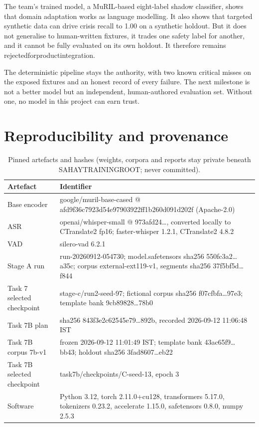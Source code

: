 \documentclass[11pt,a4paper]{article}
\newcommand{\codeus}{\textunderscore\allowbreak}
\DeclareRobustCommand{\code}[1]{{\ttfamily\let\_\codeus #1}}
\begin{document}
The team's trained model, a MuRIL-based eight-label shadow classifier, shows that domain adaptation
works as language modelling. It also shows that targeted synthetic data can drive crisis recall to
1.00 on a synthetic holdout. But it does not generalise to human-written fixtures, it trades one
safety label for another, and it cannot be fully evaluated on its own holdout. It therefore remains
\code{rejected\_for\_product\_integration}.

The deterministic pipeline stays the authority, with two known critical misses on the exposed
fixtures and an honest record of every failure. The next milestone is not a better model but an
independent, human-authored evaluation set. Without one, no model in this project can earn trust.

\appendix
\section{Reproducibility and provenance}
\label{app:repro}

\begin{table}[!htbp]
\centering\footnotesize
\caption{Pinned artefacts and hashes (weights, corpora and reports stay private beneath \code{SAHAY\_TRAINING\_ROOT}; never committed).}
\begin{tabularx}{\linewidth}{@{}>{\raggedright\arraybackslash}p{4.0cm}>{\raggedright\arraybackslash}X@{}}
\toprule
Artefact & Identifier \\
\midrule
Base encoder & \code{google/muril-base-cased} @ \code{afd9f36c7923d54e97903922ff1b260d091d202f} (Apache-2.0) \\
ASR & \code{openai/whisper-small} @ \code{973afd24\ldots}, converted locally to CTranslate2 fp16; faster-whisper 1.2.1, CTranslate2 4.8.2 \\
VAD & \code{silero-vad} 6.2.1 \\
Stage A run & \code{run-20260912-054730}; \code{model.safetensors} sha256 \code{550fc3a2\ldots a35c}; corpus \code{external-ext119-v1}, segments sha256 \code{37f5bf5d\ldots f844} \\
Task 7 selected checkpoint & \code{stage-c/run2-seed-97}; fictional corpus sha256 \code{f07cfbfa\ldots 97e3}; template bank \code{9cb89828\ldots 78b0} \\
Task 7B plan & sha256 \code{843f3e2c62545e79\ldots 892b}, recorded 2026-09-12 11:06:48 IST \\
Task 7B corpus \code{7b-v1} & frozen 2026-09-12 11:01:49 IST; template bank \code{43ac65f9\ldots bb43}; holdout sha256 \code{3fad8607\ldots eb22} \\
Task 7B selected checkpoint & \code{task7b/checkpoints/C-seed-13}, epoch 3 \\
Software & Python 3.12, torch 2.11.0+cu128, transformers 5.17.0, tokenizers 0.23.2, accelerate 1.15.0, safetensors 0.8.0, numpy 2.5.3 \\
\bottomrule
\end{tabularx}
\end{table}
\end{document}
